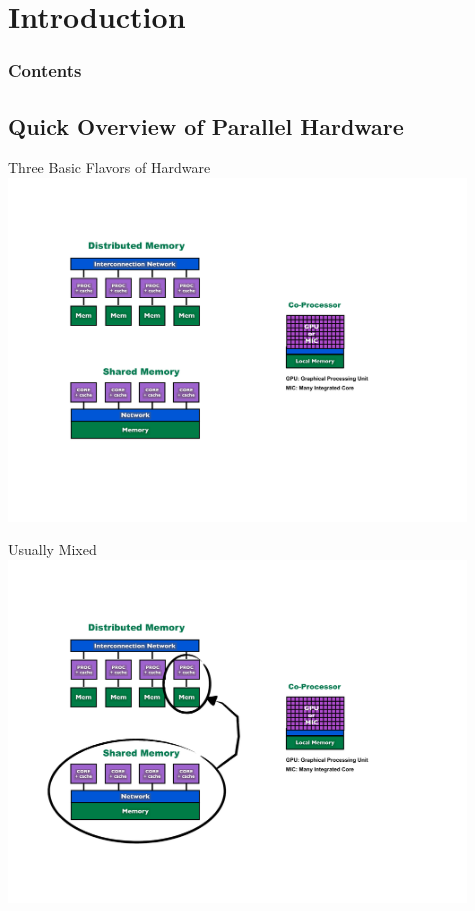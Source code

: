\section{Introduction}

\hidenum
\begin{frame}[noframenumbering]
\frametitle{Contents}
 \tableofcontents[currentsection,hideothersubsections,sectionstyle=show/hide]
\end{frame}
\shownum

\subsection{Quick Overview of Parallel Hardware}

\begin{frame}
\begin{block}{Three Basic Flavors of Hardware}
    \includegraphics[width=0.91\textwidth]{pics/ParallelHardware1.pdf}
\end{block}
\end{frame}

\begin{frame}
\begin{block}{Usually Mixed}
    \includegraphics[width=0.91\textwidth]{pics/ParallelHardware2.pdf}
\end{block}
\end{frame}

